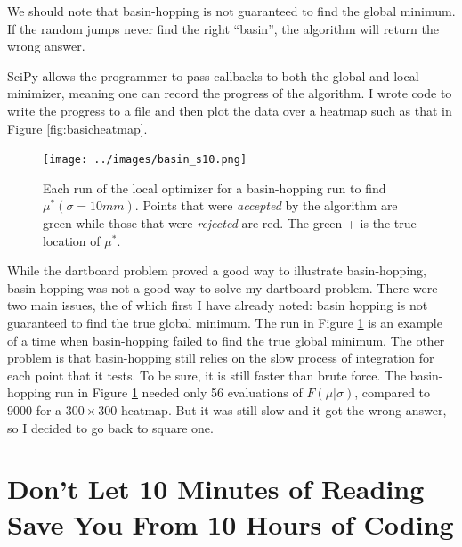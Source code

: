 \documentclass[]{article}
\newcommand{\mustar}{\ensuremath{\mu^* }}
\begin{document}
We should note that basin-hopping is not guaranteed to find the global minimum. If the random jumps never find the right ``basin'', the algorithm will return the wrong answer.

SciPy allows the programmer to pass callbacks to both the global and local minimizer, meaning one can record the progress of the algorithm. I wrote code to write the progress to a file and then plot the data over a heatmap such as that in Figure \ref{fig:basicheatmap}.
\begin{figure}[h!]
	\centering
	\texttt{[image: ../images/basin\_s10.png]}
	\caption{Each run of the local optimizer for a basin-hopping run to find $\mustar(\sigma=10mm)$.  Points that were \textit{accepted} by the algorithm are green while those that were \textit{rejected} are red. The green + is the true location of \mustar.}
	\label{fig:basin}
\end{figure}

While the dartboard problem proved a good way to illustrate basin-hopping, basin-hopping was not a good way to solve my dartboard problem. There were two main issues, the of which first I have already noted: basin hopping is not guaranteed to find the true global minimum. The run in Figure \ref{fig:basin} is an example of a time when basin-hopping failed to find the true global minimum. The other problem is that basin-hopping still relies on the slow process of integration for each point that it tests. To be sure, it is still faster than brute force. The basin-hopping run in Figure \ref{fig:basin} needed only 56 evaluations of $F(\mu \vert \sigma)$, compared to 9000 for a $300 \times 300$ heatmap. But it was still slow and it got the wrong answer, so I decided to go back to square one.

\section{Don't Let 10 Minutes of Reading Save You From 10 Hours of Coding}










	

\printbibliography
\end{document}
